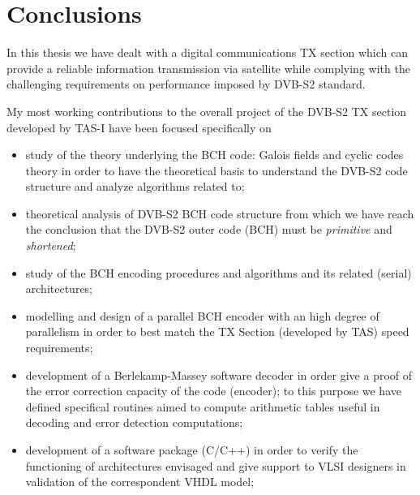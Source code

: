 \chapter{Conclusions} \label{ch:Conclusions}

In this thesis we have dealt with a digital communications TX section which can provide a reliable information transmission via satellite while complying with the challenging requirements on performance imposed by DVB-S2 standard.

My most working contributions to the overall project of the DVB-S2 TX section developed by TAS-I have been focused specifically on
\begin{itemize}
\item study of the theory underlying the BCH code: Galois fields and cyclic codes theory in order to have the theoretical basis to understand the DVB-S2 code structure and analyze algorithms related to;
\item theoretical analysis of DVB-S2 BCH code structure from which we have reach the conclusion that the DVB-S2 outer code (BCH) must be \emph{primitive} and \emph{shortened};
\item study of the BCH encoding procedures and algorithms and its related (serial) architectures;
\item modelling and design of a parallel BCH encoder with an high degree of parallelism in order to best match the TX Section (developed by TAS) speed requirements;
\item development of a Berlekamp-Massey software decoder in order give a proof of the error correction capacity of the code (encoder); to this purpose we have defined specifical routines aimed to compute arithmetic tables useful in decoding and error detection computations;
\item development of a software package (C/C++) in order to verify the functioning of architectures envisaged and give support to VLSI designers in validation of the correspondent VHDL model;
\end{itemize}

